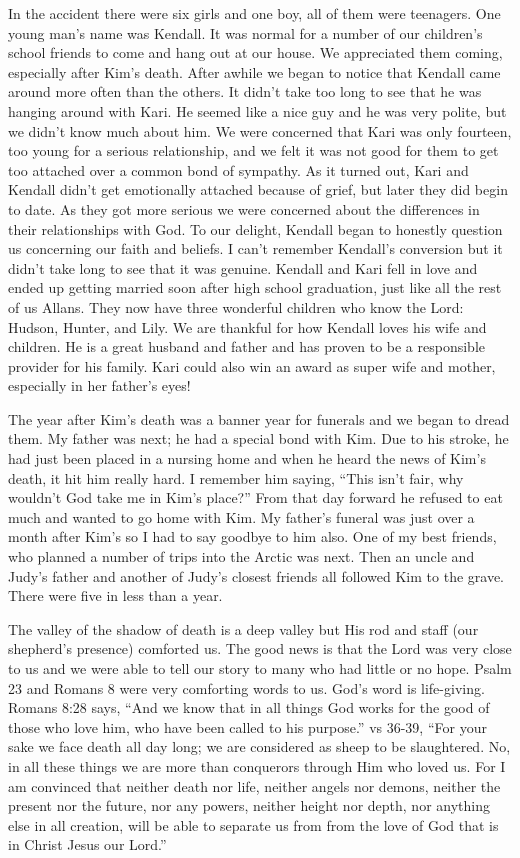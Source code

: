 \documentclass[oneside]{book}
\begin{document}
In the accident there were six girls and one boy, all of them were teenagers. One young man's name was Kendall. It was normal for a number of our children’s school friends to come and hang out at our house. We appreciated them coming, especially after Kim’s death. After awhile we began to notice that Kendall came around more often than the others. It didn't take too long to see that he was hanging around with Kari. He seemed like a nice guy and he was very polite, but we didn't know much about him. We were concerned that Kari was only fourteen, too young for a serious relationship, and we felt it was not good for them to get too attached over a common bond of sympathy. As it turned out, Kari and Kendall didn't get emotionally attached because of grief, but later they did begin to date. As they got more serious we were concerned about the differences in their relationships with God. To our delight, Kendall began to honestly question us concerning our faith and beliefs. I can't remember Kendall's conversion but it didn't take long to see that it was genuine. Kendall and Kari fell in love and ended up getting married soon after high school graduation, just like all the rest of us Allans. They now have three wonderful children who know the Lord: Hudson, Hunter, and Lily. We are thankful for how Kendall loves his wife and children. He is a great husband and father and has proven to be a responsible provider for his family. Kari could also win an award as super wife and mother, especially in her father's eyes!

The year after Kim’s death was a banner year for funerals and we began to dread them. My father was next; he had a special bond with Kim. Due to his stroke, he had just been placed in a nursing home and when he heard the news of Kim's death, it hit him really hard. I remember him saying, “This isn't fair, why wouldn't God take me in Kim’s place?” From that day forward he refused to eat much and wanted to go home with Kim. My father's funeral was just over a month after Kim’s so I had to say goodbye to him also. One of my best friends, who planned a number of trips into the Arctic was next. Then an uncle and Judy's father and another of Judy's closest friends all followed Kim to the grave. There were five in less than a year. 

The valley of the shadow of death is a deep valley but His rod and staff (our shepherd's presence) comforted us. The good news is that the Lord was very close to us and we were able to tell our story to many who had little or no hope. Psalm 23 and Romans 8 were very comforting words to us. God's word is life-giving. Romans 8:28 says, “And we know that in all things God works for the good of those who love him, who have been called to his purpose.” vs 36-39, “For your sake we face death all day long; we are considered as sheep to be slaughtered. No, in all these things we are more than conquerors through Him who loved us. For I am convinced that neither death nor life, neither angels nor demons, neither the present nor the future, nor any powers, neither height nor depth, nor anything else in all creation, will be able to separate us from from the love of God that is in Christ Jesus our Lord.”
\end{document}
